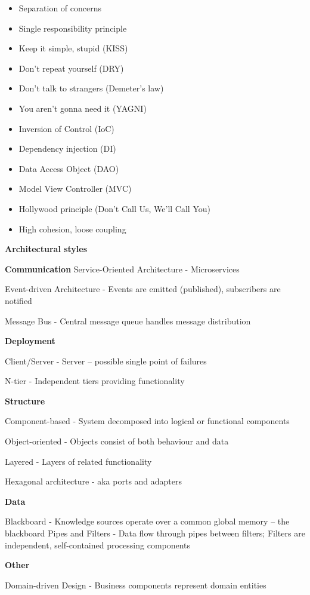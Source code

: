 \begin{itemize}
    \item Separation of concerns
    \item Single responsibility principle
    \item Keep it simple, stupid (KISS)
    \item Don’t repeat yourself (DRY)
    \item Don’t talk to strangers (Demeter’s law)
    \item You aren’t gonna need it (YAGNI)
    \item Inversion of Control (IoC)
    \item Dependency injection (DI)
    \item Data Access Object (DAO)
    \item Model View Controller (MVC)
    \item Hollywood principle (Don't Call Us, We'll Call You)
    \item High cohesion, loose coupling
\end{itemize}

\textbf{Architectural styles}

\textbf{Communication}
Service-Oriented Architecture - Microservices

Event-driven Architecture - Events are emitted (published), subscribers are notified

Message Bus - Central message queue handles message distribution

\textbf{Deployment}

Client/Server - Server – possible single point of failures

N-tier - Independent tiers providing functionality

\textbf{Structure}

Component-based - System decomposed into logical or functional components

Object-oriented - Objects consist of both behaviour and data

Layered - Layers of related functionality

Hexagonal architecture - aka ports and adapters

\textbf{Data}

Blackboard - Knowledge sources operate over a common global memory – the blackboard
Pipes and Filters - Data flow through pipes between filters; Filters are independent, self-contained processing components

\textbf{Other}

Domain-driven Design - Business components represent domain entities

